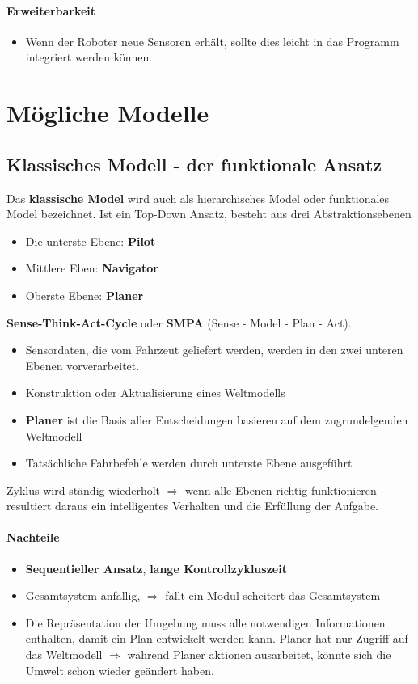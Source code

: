 \paragraph{Erweiterbarkeit}
\begin{itemize}
	\item Wenn der Roboter neue Sensoren erhält, sollte dies leicht in das Programm integriert werden können.
\end{itemize}
\section{Mögliche Modelle}
\subsection{Klassisches Modell - der funktionale Ansatz}
Das \textbf{klassische Model} wird auch als hierarchisches Model oder funktionales Model bezeichnet.
Ist ein Top-Down Ansatz, besteht aus drei Abstraktionsebenen
\begin{itemize}
	\item Die unterste Ebene: \textbf{Pilot}
	\item Mittlere Eben: \textbf{Navigator}
	\item Oberste Ebene: \textbf{Planer}
\end{itemize}
\textbf{Sense-Think-Act-Cycle} oder \textbf{SMPA} (Sense - Model - Plan - Act).
\begin{itemize}
	\item Sensordaten, die vom Fahrzeut geliefert werden, werden in den zwei unteren Ebenen vorverarbeitet.
	\item Konstruktion oder Aktualisierung eines Weltmodells
	\item \textbf{Planer} ist die Basis aller Entscheidungen basieren auf dem zugrundelgenden Weltmodell
	\item Tatsächliche Fahrbefehle werden durch unterste Ebene ausgeführt
\end{itemize}
Zyklus wird ständig wiederholt $\Rightarrow$ wenn alle Ebenen richtig funktionieren resultiert daraus ein intelligentes Verhalten und die Erfüllung der Aufgabe.
\paragraph{Nachteile}
\begin{itemize}
	\item \textbf{Sequentieller Ansatz}, \textbf{lange Kontrollzykluszeit}
	\item Gesamtsystem anfällig, $\Rightarrow$ fällt ein Modul scheitert das Gesamtsystem
	\item Die Repräsentation der Umgebung muss alle notwendigen Informationen enthalten, damit ein Plan entwickelt werden kann.
	Planer hat nur Zugriff auf das Weltmodell $\Rightarrow$ während Planer aktionen ausarbeitet, könnte sich die Umwelt schon wieder geändert haben.
\end{itemize}
